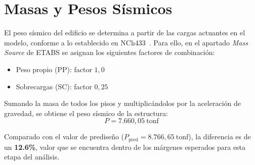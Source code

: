 \section{Masas y Pesos Sísmicos}
\label{sec:masas}

El peso sísmico del edificio se determina a partir de las cargas actuantes en el 
modelo, conforme a lo establecido en NCh433~\cite{NCh433:1996}. Para ello, en el 
apartado \textit{Mass Source} de ETABS se asignan los siguientes factores de 
combinación:

\begin{itemize}
    \item Peso propio (PP): factor $1{,}0$
    \item Sobrecargas (SC): factor $0{,}25$
\end{itemize}

Sumando la masa de todos los pisos y multiplicándolos por la aceleración de gravedad, se obtiene el peso sísmico de la estructura:
\begin{equation}
    P = 7{.}660{,}05\ \text{tonf}
\end{equation}

Comparado con el valor de prediseño ($P_{\text{pred}} = 8{.}766{,}65\ \text{tonf}$), 
la diferencia es de un \textbf{12.6\%}, valor que se encuentra dentro de los márgenes 
esperados para esta etapa del análisis.